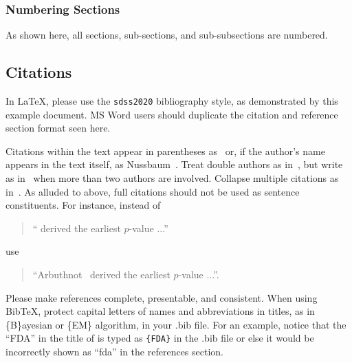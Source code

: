 \documentclass[10pt]{article}
\begin{document}
\subsubsection{Numbering Sections}
As shown here, all sections, sub-sections, and sub-subsections are numbered.

\subsection{Citations}

In \LaTeX, please use the
{\tt sdss2020} bibliography style, as demonstrated by this example document.  
MS Word users should duplicate the citation and reference section format seen here.  

Citations within the text appear in parentheses
as~\cite{Nussbaum2018} or, if the author's name appears in the text
itself, as Nussbaum~.  Treat double authors as
in~\cite{Wasserstein2016}, but write as in~\cite{Brunner} when more than two
authors are involved. Collapse multiple citations as
in~\cite{LaVange2019,Wasserstein2016}.  As alluded to above, full citations should not
be used as sentence constituents.  For instance, instead of
\begin{quote}
  ``\cite{Arbuthnot1710} derived the earliest $p$-value ...''
\end{quote}
use
\begin{quote}
``Arbuthnot~ derived the earliest $p$-value ...''.
\end{quote}
Please make references complete, presentable, and
consistent. When using Bib\TeX, protect capital letters of names and
abbreviations in titles, as in \{B\}ayesian or \{EM\} algorithm, 
in your .bib file.  For an example, notice that the ``FDA'' in 
the title of \cite{LaVange2019} is typed as \verb+{FDA}+ in the .bib file
or else it would be incorrectly shown as ``fda'' in the references section.


%
\end{document}
